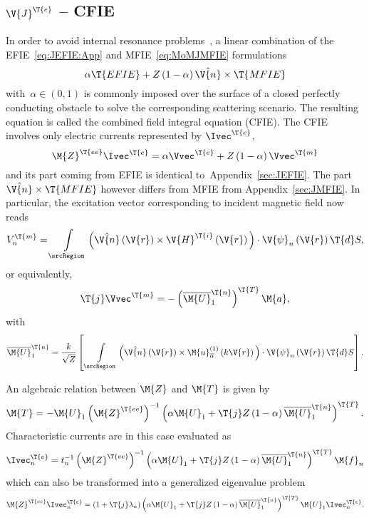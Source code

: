 \documentclass[journal]{IEEEtran}
\providecommand{\Je}{\V{J}^\T{e}} %
\providecommand{\Umat}{\M{U}} %
\providecommand{\Ie}{\Ivec^{\T{e}}} %
\providecommand{\Ve}{\Vvec^{\T{e}}} %
\providecommand{\Vm}{\Vvec^{\T{m}}} %
\providecommand{\Hi}{\V{H}^{\T{i}}} %
\begin{document}
\subsection{$\Je$ -- CFIE}
In order to avoid internal resonance problems~\cite{1978_Harrington_TechRep,ChewTongHu_IntegralEquationMethodsForElectromagneticAndElasticWaves}, a linear combination of the EFIE~\eqref{eq:JEFIE:App} and MFIE~\eqref{eq:MoMJMFIE} formulations
\begin{equation}
    \alpha \T{EFIE} + Z \left( 1 - \alpha  \right) \hat{\V{n}} \times \T{MFIE}
\end{equation}
with~$\alpha \in \left(0,1 \right)$ is commonly imposed over the surface of a closed perfectly conducting obstacle to solve the corresponding scattering scenario. The resulting equation is called the combined field integral equation (CFIE). The CFIE involves only electric currents represented by $\Ie$,
\begin{equation}
    \label{eq:MoMJCFIE}
    \M{Z}^\T{ee} \Ie = \alpha \Ve + Z \left( 1 - \alpha  \right) \Vm
\end{equation}
and its part coming from EFIE is identical to~Appendix~\ref{sec:JEFIE}. The part $\hat{\V{n}} \times \T{MFIE}$ however differs from MFIE from Appendix~\ref{sec:JMFIE}. In particular, the excitation vector corresponding to incident magnetic field now reads
\begin{equation}
    \label{eq:nW}
    V^\T{m}_n = \int \limits_{\srcRegion} \Big( \hat{\V{n}} \left( \V{r} \right) \times \Hi\left( \V{r} \right) \Big) \cdot \V{\psi}_n \left( \V{r} \right) \T{d}S,
\end{equation}
or equivalently,
\begin{equation}
    \T{j} \Vm = 
    - \left( \overline{\Umat}_1^\T{n} \right)^\T{T} \M{a},
\end{equation}
with
\begin{equation}
    \label{eq:nSmatrix}
    \overline{\Umat}_1^\T{n} = \dfrac{k}{\sqrt{Z}} \left[ \, \int \limits_{\srcRegion} \Big( \hat{\V{n}} \left( \V{r} \right) \times \M{u}_{\overline{\alpha}}^{\left(1\right)} \left(k \V{r} \right) \Big) \cdot \V{\psi}_n \left( \V{r} \right) \T{d}S \right].
\end{equation}

An algebraic relation between $\M{Z}$ and $\M{T}$ is given by
\begin{equation}
\M{T} = -\Umat_1 \left( \M{Z}^\T{ee} \right)^{-1} \left( \alpha \Umat_1 + \T{j} Z\left( 1 - \alpha  \right)  
 \overline{\Umat}_1^\T{n} \right)^\T{T}.  
\end{equation}
Characteristic currents are in this case evaluated as
\begin{equation}
    \Ie_n = t_n^{-1} \left( \M{Z}^\T{ee} \right)^{-1} \left( \alpha \Umat_1 + \T{j} Z \left( 1 - \alpha  \right) \overline{\Umat}_1^\T{n} \right)^\T{T} \M{f}_n
\end{equation}
which can also be transformed into a generalized eigenvalue problem
\begin{equation}
    \M{Z}^\T{ee} \Ie_n = \left(1 + \T{j}\lambda_n \right) \left( \alpha \Umat_1 + \T{j} Z \left( 1 - \alpha  \right) \overline{\Umat}_1^\T{n} \right)^\T{T} \Umat_1 \Ie_n.
\end{equation}
\end{document}
